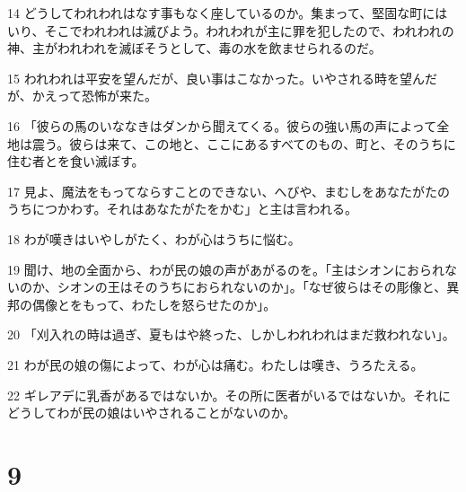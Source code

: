 \par 14 どうしてわれわれはなす事もなく座しているのか。集まって、堅固な町にはいり、そこでわれわれは滅びよう。われわれが主に罪を犯したので、われわれの神、主がわれわれを滅ぼそうとして、毒の水を飲ませられるのだ。
\par 15 われわれは平安を望んだが、良い事はこなかった。いやされる時を望んだが、かえって恐怖が来た。
\par 16 「彼らの馬のいななきはダンから聞えてくる。彼らの強い馬の声によって全地は震う。彼らは来て、この地と、ここにあるすべてのもの、町と、そのうちに住む者とを食い滅ぼす。
\par 17 見よ、魔法をもってならすことのできない、へびや、まむしをあなたがたのうちにつかわす。それはあなたがたをかむ」と主は言われる。
\par 18 わが嘆きはいやしがたく、わが心はうちに悩む。
\par 19 聞け、地の全面から、わが民の娘の声があがるのを。「主はシオンにおられないのか、シオンの王はそのうちにおられないのか」。「なぜ彼らはその彫像と、異邦の偶像とをもって、わたしを怒らせたのか」。
\par 20 「刈入れの時は過ぎ、夏もはや終った、しかしわれわれはまだ救われない」。
\par 21 わが民の娘の傷によって、わが心は痛む。わたしは嘆き、うろたえる。
\par 22 ギレアデに乳香があるではないか。その所に医者がいるではないか。それにどうしてわが民の娘はいやされることがないのか。

\chapter{9}

